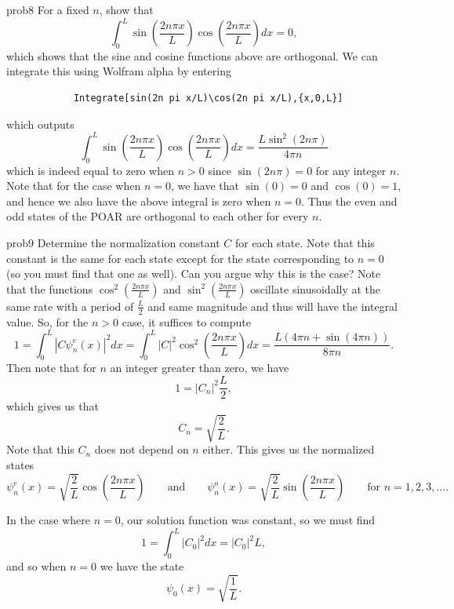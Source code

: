 \documentclass{article}
\begin{document}
\begin{solution}{}{prob8}
		For a fixed $n$, show that
		\[
		\int_0^L \sin\left(\frac{2n\pi x}{L}\right)\cos\left(\frac{2n\pi x}{L}\right)dx =0,
		\]
		which shows that the sine and cosine functions above are orthogonal.
		\tcblower
		We can integrate this using Wolfram alpha by entering
		\begin{verbatim}
			Integrate[sin(2n pi x/L)\cos(2n pi x/L),{x,0,L}]
		\end{verbatim}
		which outputs
		\[
		\int_0^L \sin\left(\frac{2n\pi x}{L}\right)\cos\left(\frac{2n\pi x}{L}\right)dx = \frac{L\sin^2(2 n \pi)}{4\pi n}
		\]
		which is indeed equal to zero when $n>0$ since $\sin(2 n \pi)=0$ for any integer $n$.  Note that for the case when $n=0$, we have that $\sin(0)=0$ and $\cos(0)=1$, and hence we also have the above integral is zero when $n=0$. Thus the even and odd states of the POAR are orthogonal to each other for every $n$.
	\end{solution}

\begin{solution}{}{prob9}
		Determine the normalization constant $C$ for each state. Note that this constant is the same for each state except for the state corresponding to $n=0$ (so you must find that one as well). Can you argue why this is the case?
		\tcblower
		Note that the functions $\cos^2\left(\frac{2n\pi x}{L}\right)$ and $\sin^2\left(\frac{2n\pi x}{L}\right)$ oscillate sinusoidally at the same rate with a period of $\frac{L}{2}$ and same magnitude and thus will have the integral value.  So, for the $n>0$ case, it suffices to compute
		\[
		1=\int_0^L \left| C\psi_n^e(x)\right|^2 dx = \int_0^L |C|^2 \cos^2\left(\frac{2n\pi x}{L}\right) dx  = \frac{L (4\pi n+\sin(4\pi n))}{8\pi n}.
		\]
		Then note that for $n$ an integer greater than zero, we have
		\[
		1 = |C_n|^2 \frac{L}{2},
		\]
		which gives us that
		\[
		\boxed{C_n= \sqrt{\frac{2}{L}}.}
		\]
		Note that this $C_n$ does not depend on $n$ either. This gives us the normalized states
		\[
		\boxed{\psi_n^e(x) = \sqrt{\frac{2}{L}} \cos\left(\frac{2n\pi x}{L}\right)} \qquad \textrm{and} \qquad \boxed{\psi_n^o(x) = \sqrt{\frac{2}{L}} \sin\left(\frac{2n\pi x}{L}\right)} \qquad \textrm{for $n=1,2,3,\dots$}.
		\]
		
		In the case where $n=0$, our solution function was constant, so we must find
		\[
		1=\int_0^L |C_0|^2 dx = |C_0|^2 L,
		\]
		and so when $n=0$ we have the state
		\[
		\boxed{\psi_0(x)=\sqrt{\frac{1}{L}}.}
		\]
	\end{solution}
\end{document}
